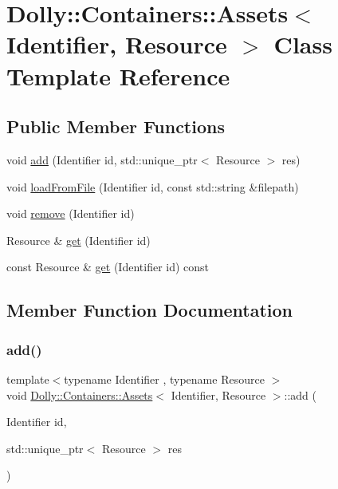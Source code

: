 \hypertarget{class_dolly_1_1_containers_1_1_assets}{}\section{Dolly\+:\+:Containers\+:\+:Assets$<$ Identifier, Resource $>$ Class Template Reference}
\label{class_dolly_1_1_containers_1_1_assets}
\subsection*{Public Member Functions}
\begin{DoxyCompactItemize}
\item 
void \hyperlink{class_dolly_1_1_containers_1_1_assets_ad75777f33ab43acb2aaab5254e903f75}{add} (Identifier id, std\+::unique\+\_\+ptr$<$ Resource $>$ res)
\item 
void \hyperlink{class_dolly_1_1_containers_1_1_assets_aff129b3dc003acb42d8b7ce27b0f0a2a}{load\+From\+File} (Identifier id, const std\+::string \&filepath)
\item 
void \hyperlink{class_dolly_1_1_containers_1_1_assets_a83335c3229a5b3aebea546309718445c}{remove} (Identifier id)
\item 
Resource \& \hyperlink{class_dolly_1_1_containers_1_1_assets_abe6916123b573c9a4440e15213168ad8}{get} (Identifier id)
\item 
const Resource \& \hyperlink{class_dolly_1_1_containers_1_1_assets_a07cfae702a571e0dd17c44e531f7823d}{get} (Identifier id) const
\end{DoxyCompactItemize}


\subsection{Member Function Documentation}
\mbox{\label{class_dolly_1_1_containers_1_1_assets_ad75777f33ab43acb2aaab5254e903f75}} 
\subsubsection{\texorpdfstring{add()}{add()}}
{\footnotesize\ttfamily template$<$typename Identifier , typename Resource $>$ \\
void \hyperlink{class_dolly_1_1_containers_1_1_assets}{Dolly\+::\+Containers\+::\+Assets}$<$ Identifier, Resource $>$\+::add (\begin{DoxyParamCaption}\item[{Identifier}]{id,  }\item[{std\+::unique\+\_\+ptr$<$ Resource $>$}]{res }\end{DoxyParamCaption})}

